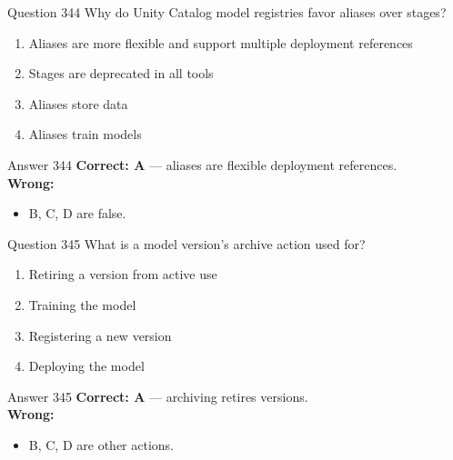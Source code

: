 \documentclass[aspectratio=169,11pt]{beamer}
\begin{document}
	\begin{frame}{Question 344}
		Why do Unity Catalog model registries favor aliases over stages?
		\begin{enumerate}[label=\Alph*.]
			\item Aliases are more flexible and support multiple deployment references
			\item Stages are deprecated in all tools
			\item Aliases store data
			\item Aliases train models
		\end{enumerate}
	\end{frame}
	\begin{frame}{Answer 344}
		\textbf{Correct: A} --- aliases are flexible deployment references.\\
		\vspace{0.5em}
		\textbf{Wrong:}
		\begin{itemize}
			\item B, C, D are false.
		\end{itemize}
	\end{frame}
	
	\begin{frame}{Question 345}
		What is a model version's archive action used for?
		\begin{enumerate}[label=\Alph*.]
			\item Retiring a version from active use
			\item Training the model
			\item Registering a new version
			\item Deploying the model
		\end{enumerate}
	\end{frame}
	\begin{frame}{Answer 345}
		\textbf{Correct: A} --- archiving retires versions.\\
		\vspace{0.5em}
		\textbf{Wrong:}
		\begin{itemize}
			\item B, C, D are other actions.
		\end{itemize}
	\end{frame}
	
\end{document}
